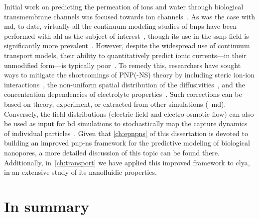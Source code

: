 Initial work on predicting the permeation of ions and water through biological transmembrane channels was
focused towards ion channels~\cite{Eisenberg-1996,Chen-1997,Corry-2003}. As was the case with \gls{md}, to
date, virtually all the continuum modeling studies of \glspl{bnp} have been performed with \gls{ahl} as the
subject of
interest~\cite{Noskov-2004,Cozmuta-2005,OKeeffe-2007,Simakov-2010,Pederson-2015,Simakov-2018,Aguilella-Arzo-2020},
though its use in the \gls{ssnp} field is significantly more
prevalent~\cite{Daiguji-2004,Cervera-2005,White-2008,Lu-2012,Chaudhry-2014,Laohakunakorn-2015,Hulings-2018,Rigo-2019,Melnikov-2020}.
However, despite the widespread use of continuum transport models, their ability to quantitatively predict
ionic currents---in their unmodified form---is typically poor~\cite{Corry-2000,Collins-2012}. To remedy this,
researchers have sought ways to mitigate the shortcomings of {PNP}(-{NS}) theory by including steric
ion-ion interactions~\cite{Kilic-2007,Lu-2011,Liu-2020}, the non-uniform spatial distribution of the
diffusivities~\cite{Cozmuta-2005,Furini-2006,Simakov-2010,}, and the concentration dependencies of electrolyte
properties~\cite{Baldessari-2008-1,Burger-2012,Chen-2016}. Such corrections can be based on theory,
experiment, or extracted from other simulations (\eg~\gls{md}). Conversely, the field distributions (electric
field and electro-osmotic flow) can also be used as input for \gls{bd} simulations to stochastically map
the capture dynamics of individual particles~\cite{Pederson-2015,Hulings-2018}. Given that \cref{ch:epnpns} of
this dissertation is devoted to building an improved \gls{pnp-ns} framework for the predictive modeling of
biological nanopores, a more detailed discussion of this topic can be found there. Additionally,
in~\cref{ch:transport} we have applied this improved framework to \gls{clya}, in an extensive study of its
nanofluidic properties.


%
%

\section{In summary}
%

